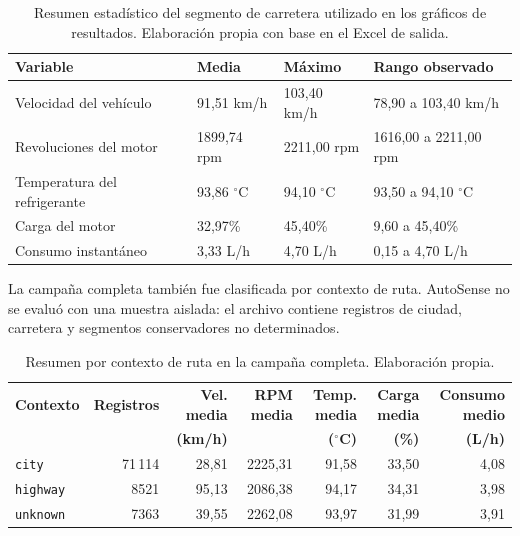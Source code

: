 \documentclass[12pt,letterpaper]{report}
\begin{document}
\begin{table}[!htbp]
\centering
\scriptsize
\caption{Resumen estadístico del segmento de carretera utilizado en los gráficos de resultados. Elaboración propia con base en el Excel de salida.}
\label{tab:resultados-highway-resumen}
\begin{tabular}{@{}p{}p{}p{}p{}@{}}
\toprule
\textbf{Variable} & \textbf{Media} & \textbf{Máximo} & \textbf{Rango observado} \\
\midrule
Velocidad del vehículo & 91,51 km/h & 103,40 km/h & 78,90 a 103,40 km/h \\
\addlinespace
Revoluciones del motor & 1899,74 rpm & 2211,00 rpm & 1616,00 a 2211,00 rpm \\
\addlinespace
Temperatura del refrigerante & 93,86 $^\circ$C & 94,10 $^\circ$C & 93,50 a 94,10 $^\circ$C \\
\addlinespace
Carga del motor & 32,97\% & 45,40\% & 9,60 a 45,40\% \\
\addlinespace
Consumo instantáneo & 3,33 L/h & 4,70 L/h & 0,15 a 4,70 L/h \\
\bottomrule
\end{tabular}
\end{table}

La campaña completa también fue clasificada por contexto de ruta. AutoSense no se evaluó con una muestra aislada: el archivo contiene registros de ciudad, carretera y segmentos conservadores no determinados.

\begin{table}[!htbp]
\centering
\scriptsize
\caption{Resumen por contexto de ruta en la campaña completa. Elaboración propia.}
\label{tab:route-context-summary}
\begin{tabular}{@{}lrrrrrr@{}}
\toprule
\textbf{Contexto} & \textbf{Registros} & \textbf{Vel. media} & \textbf{RPM media} & \textbf{Temp. media} & \textbf{Carga media} & \textbf{Consumo medio} \\
 & & \textbf{(km/h)} & & \textbf{($^\circ$C)} & \textbf{(\%)} & \textbf{(L/h)} \\
\midrule
\texttt{city} & 71\,114 & 28,81 & 2225,31 & 91,58 & 33,50 & 4,08 \\
\texttt{highway} & 8521 & 95,13 & 2086,38 & 94,17 & 34,31 & 3,98 \\
\texttt{unknown} & 7363 & 39,55 & 2262,08 & 93,97 & 31,99 & 3,91 \\
\bottomrule
\end{tabular}
\end{table}
\end{document}
